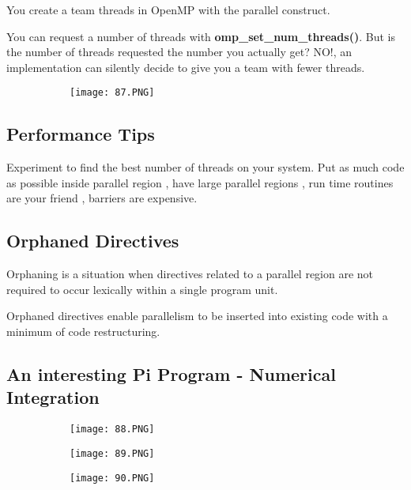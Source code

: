 \documentclass{article}
\begin{document}
You create a team threads in OpenMP with the parallel construct.

You can request a number of threads with \textbf{omp\_set\_num\_threads()}. But is the number of threads requested the number you actually get? NO!, an implementation can silently decide to give you a team with fewer threads.


\begin{figure}[ht!]
  \centering
  \begin{subfigure}[b]{0.6\linewidth}
    \texttt{[image: 87.PNG]}
  \end{subfigure}
\end{figure}

\subsection{Performance Tips}

Experiment to find the best number of threads on your system. Put as much code as possible inside parallel region , have large parallel regions , run time routines are your friend , barriers are expensive.

\subsection{Orphaned Directives}

Orphaning is a situation when directives related to a parallel region are not required to occur lexically within a single program unit.

Orphaned directives enable parallelism to be inserted into existing code with a minimum of code restructuring.

\subsection{An interesting Pi Program - Numerical Integration}

\begin{figure}[ht!]
  \centering
  \begin{subfigure}[b]{0.5\linewidth}
    \texttt{[image: 88.PNG]}
  \end{subfigure}
     \begin{subfigure}[b]{0.49\textwidth}
         \centering
         \texttt{[image: 89.PNG]}
     \end{subfigure}
\end{figure}

\begin{figure}[ht!]
  \centering
  \begin{subfigure}[b]{0.5\linewidth}
    \texttt{[image: 90.PNG]}
  \end{subfigure}
\end{figure}
\end{document}
